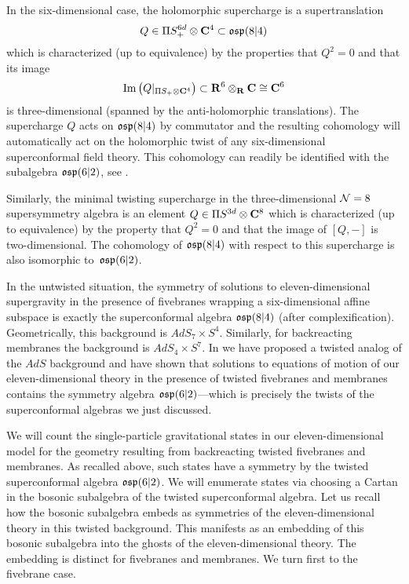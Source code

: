In the six-dimensional case, the holomorphic supercharge is a supertranslation 
\[
Q \in \Pi S^{6d}_+ \otimes \mathbf{C}^4 \subset \mathfrak{osp}(8|4)
\]
which is characterized (up to equivalence) by the properties that $Q^2 = 0$ and that its image
\[
{\rm Im}\left(Q|_{\Pi S_+ \otimes \mathbf{C}^4} \right) \subset \mathbf{R}^6 \otimes_{\mathbf{R}} \mathbf{C} \cong \mathbf{C}^6
\]
is three-dimensional (spanned by the anti-holomorphic translations). 
The supercharge $Q$ acts on $\mathfrak{osp}(8|4)$ by commutator and the resulting cohomology will automatically act on the holomorphic twist of any six-dimensional superconformal field theory. 
This cohomology can readily be identified with the subalgebra $\mathfrak{osp}(6|2)$, see \cite{SWe36}. 

Similarly, the minimal twisting supercharge in the three-dimensional $\mathcal N=8$ supersymmetry algebra is an element $Q \in \Pi S^{3d} \otimes \mathbf{C}^8$ which is characterized (up to equivalence) by the property that $Q^2 = 0$ and that the image of $[Q,-]$ is two-dimensional. 
The cohomology of $\mathfrak{osp}(8|4)$ with respect to this supercharge is also isomorphic to~$\mathfrak{osp}(6|2)$. 

In the untwisted situation, the symmetry of solutions to eleven-dimensional supergravity in the presence of fivebranes wrapping a six-dimensional affine subspace is exactly the superconformal algebra $\mathfrak{osp}(8|4)$ (after complexification). 
Geometrically, this background is $AdS_7 \times S^4$. 
Similarly, for backreacting membranes the background is $AdS_4 \times S^7$. 
In \cite{RSW} we have proposed a twisted analog of the $AdS$ background and have shown that solutions to equations of motion of our eleven-dimensional theory in the presence of twisted fivebranes and membranes contains the symmetry algebra $\mathfrak{osp}(6|2)$---which is precisely the twists of the superconformal algebras we just discussed.

We will count the single-particle gravitational states in our eleven-dimensional model for the geometry resulting from backreacting twisted fivebranes and membranes.
As recalled above, such states have a symmetry by the twisted superconformal algebra $\mathfrak{osp}(6|2)$.
We will enumerate states via choosing a Cartan in the bosonic subalgebra of the twisted superconformal algebra. Let us recall how the bosonic subalgebra embeds as symmetries of the eleven-dimensional theory in this twisted background.
This manifests as an embedding of this bosonic subalgebra into the ghosts of the eleven-dimensional theory. 
The embedding is distinct for fivebranes and membranes.
We turn first to the fivebrane case. 

